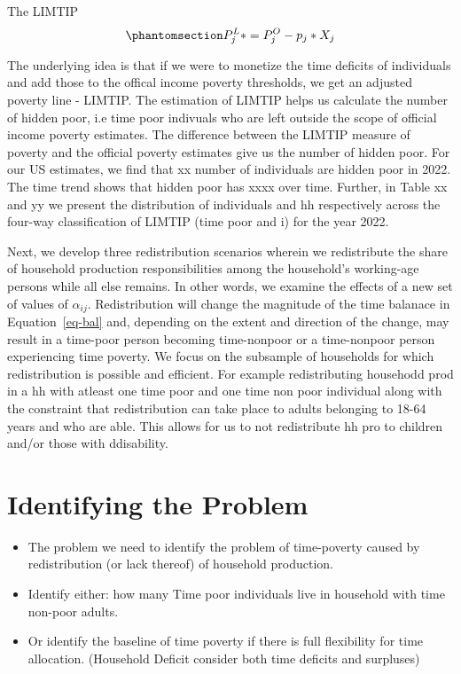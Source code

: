 \documentclass[
  11pt,
]{article}
\providecommand{\tightlist}{%
  \setlength{\itemsep}{0pt}\setlength{\parskip}{0pt}}\usepackage{longtable,booktabs,array}
\begin{document}
The LIMTIP
\begin{equation}\phantomsection\label{eq-limtip}{P_{j}^L* = P_{j}^O- p_{j}*X_{j}
}\end{equation}

The underlying idea is that if we were to monetize the time deficits of
individuals and add those to the offical income poverty thresholds, we
get an adjusted poverty line - LIMTIP. The estimation of LIMTIP helps us
calculate the number of hidden poor, i.e time poor indivuals who are
left outside the scope of official income poverty estimates. The
difference between the LIMTIP measure of poverty and the official
poverty estimates give us the number of hidden poor. For our US
estimates, we find that xx number of individuals are hidden poor in
2022. The time trend shows that hidden poor has xxxx over time. Further,
in Table xx and yy we present the distribution of individuals and hh
respectively across the four-way classification of LIMTIP (time poor and
i) for the year 2022.

Next, we develop three redistribution scenarios wherein we redistribute
the share of household production responsibilities among the household's
working-age persons while all else remains. In other words, we examine
the effects of a new set of values of \(\alpha_{ij}\). Redistribution
will change the magnitude of the time balanace in Equation~\ref{eq-bal}
and, depending on the extent and direction of the change, may result in
a time-poor person becoming time-nonpoor or a time-nonpoor person
experiencing time poverty. We focus on the subsample of households for
which redistribution is possible and efficient. For example
redistributing househodd prod in a hh with atleast one time poor and one
time non poor individual along with the constraint that redistribution
can take place to adults belonging to 18-64 years and who are able. This
allows for us to not redistribute hh pro to children and/or those with
ddisability.

\section{Identifying the Problem}\label{identifying-the-problem}

\begin{itemize}
\tightlist
\item
  The problem we need to identify the problem of time-poverty caused by
  redistribution (or lack thereof) of household production.
\item
  Identify either: how many Time poor individuals live in household with
  time non-poor adults.
\item
  Or identify the baseline of time poverty if there is full flexibility
  for time allocation. (Household Deficit consider both time deficits
  and surpluses)
\end{itemize}
\end{document}

